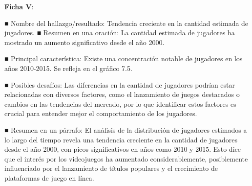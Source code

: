 \documentclass[
  letterpaper,
  DIV=11,
  numbers=noendperiod]{scrreprt}
\begin{document}
\textbf{Ficha V}:

■ Nombre del hallazgo/resultado: Tendencia creciente en la cantidad
estimada de jugadores. ■ Resumen en una oración: La cantidad estimada de
jugadores ha mostrado un aumento significativo desde el año 2000.

■ Principal característica: Existe una concentración notable de
jugadores en los años 2010-2015. Se refleja en el gráfico 7.5.

■ Posibles desafíos: Las diferencias en la cantidad de jugadores podrían
estar relacionadas con diversos factores, como el lanzamiento de juegos
destacados o cambios en las tendencias del mercado, por lo que
identificar estos factores es crucial para entender mejor el
comportamiento de los jugadores.

■ Resumen en un párrafo: El análisis de la distribución de jugadores
estimados a lo largo del tiempo revela una tendencia creciente en la
cantidad de jugadores desde el año 2000, con picos significativos en
años como 2010 y 2015. Esto dice que el interés por los videojuegos ha
aumentado considerablemente, posiblemente influenciado por el
lanzamiento de títulos populares y el crecimiento de plataformas de
juego en línea.
\end{document}
